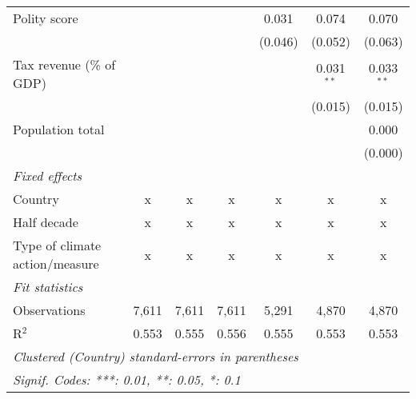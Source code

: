 \begin{tabular}{lcccccc}
   Polity score                                            &         &                &                & 0.031          & 0.074          & 0.070\\   
                                                           &         &                &                & (0.046)        & (0.052)        & (0.063)\\   
   Tax revenue (\% of GDP)                                 &         &                &                &                & 0.031$^{**}$   & 0.033$^{**}$\\   
                                                           &         &                &                &                & (0.015)        & (0.015)\\   
   Population total                                        &         &                &                &                &                & 0.000\\   
                                                           &         &                &                &                &                & (0.000)\\   
   \emph{Fixed effects}\\
   Country                                                 & x       & x              & x              & x              & x              & x\\  
   Half decade                                             & x       & x              & x              & x              & x              & x\\  
   Type of climate action/measure                          & x       & x              & x              & x              & x              & x\\  
   \midrule \emph{Fit statistics}\\
   Observations                                            & 7,611   & 7,611          & 7,611          & 5,291          & 4,870          & 4,870\\  
   R$^2$                                                   & 0.553   & 0.555          & 0.556          & 0.555          & 0.553          & 0.553\\  
   \midrule
   \multicolumn{7}{l}{\emph{Clustered (Country) standard-errors in parentheses}}\\
   \multicolumn{7}{l}{\emph{Signif. Codes: ***: 0.01, **: 0.05, *: 0.1}}\\
\end{tabular}
\par\endgroup


